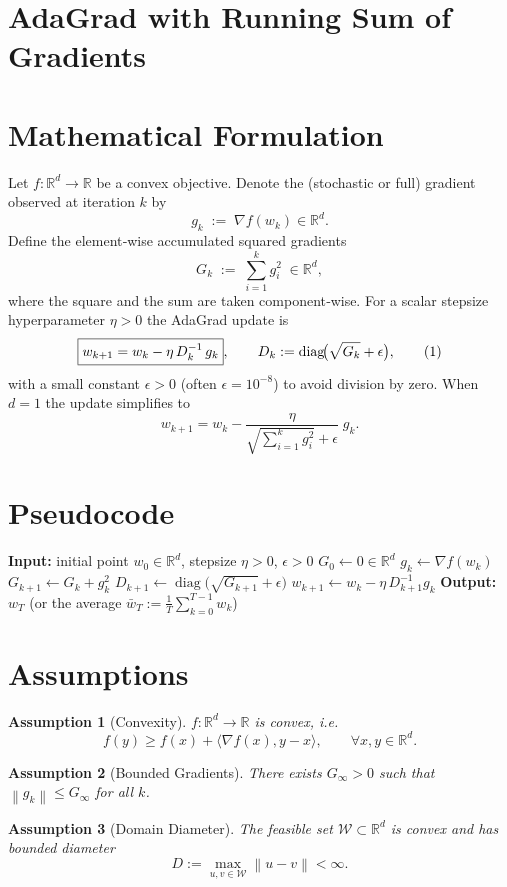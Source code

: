 \documentclass{article}
\newtheorem{assumption}{Assumption}
\newcommand{\RR}{\mathbb{R}}
\newcommand{\norm}[1]{\left\|#1\right\|}
\newcommand{\inner}[2]{\langle #1,#2\rangle}
\begin{document}
\section*{AdaGrad with Running Sum of Gradients}

\section*{Mathematical Formulation}
Let $f:\RR^{d}\rightarrow\RR$ be a convex objective.  
Denote the (stochastic or full) gradient observed at iteration $k$ by 
\[
g_{k}\;:=\;\nabla f(w_{k})\in\RR^{d}.
\]
Define the element‑wise accumulated squared gradients
\[
G_{k}\;:=\;\sum_{i=1}^{k} g_{i}^{2}\;\in\RR^{d},
\]
where the square and the sum are taken component‑wise.  
For a scalar stepsize hyperparameter $\eta>0$ the AdaGrad update is
\[
\boxed{%
w_{k+1}=w_{k}-\eta \, D_{k}^{-1}\, g_{k}},\qquad 
D_{k}:=\operatorname{diag}\!\bigl(\sqrt{G_{k}}+\epsilon\bigr),
\tag{1}
\]
with a small constant $\epsilon>0$ (often $\epsilon=10^{-8}$) to avoid division by zero.  
When $d=1$ the update simplifies to
\[
w_{k+1}=w_{k}-\frac{\eta}{\sqrt{\sum_{i=1}^{k} g_{i}^{2}}+\epsilon}\;g_{k}.
\tag{2}
\]

\section*{Pseudocode}
\begin{algorithm}[H]
\caption{AdaGrad (vector version)}\label{alg:adagrad}
\begin{algorithmic}[1]
\State \textbf{Input:} initial point $w_{0}\in\RR^{d}$, stepsize $\eta>0$, $\epsilon>0$
\State $G_{0}\gets 0\in\RR^{d}$ 
    \State $g_{k}\gets\nabla f(w_{k})$ 
    \State $G_{k+1}\gets G_{k}+g_{k}^{2}$ 
    \State $D_{k+1}\gets\operatorname{diag}\!\bigl(\sqrt{G_{k+1}}+\epsilon\bigr)$
    \State $w_{k+1}\gets w_{k}-\eta\, D_{k+1}^{-1} g_{k}$
\EndFor
\State \textbf{Output:} $w_{T}$ (or the average $\bar w_T:=\tfrac1T\sum_{k=0}^{T-1}w_{k}$)
\end{algorithmic}
\end{algorithm}

\section*{Assumptions}
\begin{assumption}[Convexity]\label{as:convex}
$f:\RR^{d}\rightarrow\RR$ is convex, i.e.
\[
f(y)\ge f(x)+\inner{\nabla f(x)}{y-x},\qquad\forall x,y\in\RR^{d}.
\]
\end{assumption}
\begin{assumption}[Bounded Gradients]\label{as:bound}
There exists $G_{\infty}>0$ such that $\norm{g_{k}}\le G_{\infty}$ for all $k$.
\end{assumption}
\begin{assumption}[Domain Diameter]\label{as:diam}
The feasible set $\mathcal{W}\subset\RR^{d}$ is convex and has bounded diameter 
\[
D:=\max_{u,v\in\mathcal{W}}\norm{u-v}<\infty .
\]
\end{assumption}
\end{document}
